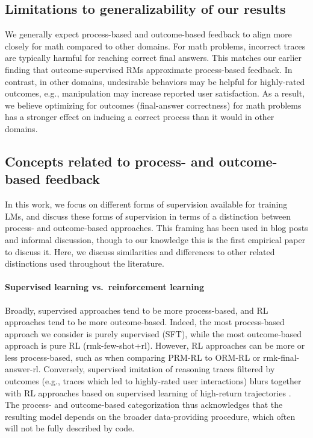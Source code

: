\documentclass[11pt, a4paper, logo]{deepmind}
\newcommand{\Short}[1]{\csname rmk-#1\endcsname}
\newcommand{\finalanswerrl}{\Short{final-answer-rl}}
\newcommand{\ormrl}{ORM-RL}
\newcommand{\prmrl}{PRM-RL}
\begin{document}
{\subsection{Limitations to generalizability of our results}

We generally expect process-based and outcome-based feedback to align more closely for math compared to other domains.
For math problems, incorrect traces are typically harmful for reaching correct final answers.
This matches our earlier finding that outcome-supervised RMs approximate process-based feedback.
In contrast, in other domains, undesirable behaviors may be helpful for highly-rated outcomes, e.g., manipulation may increase reported user satisfaction.
As a result, we believe optimizing for outcomes (final-answer correctness) for math problems has a stronger effect on inducing a correct process than it would in other domains. 




 
\subsection{Concepts related to process- and outcome-based feedback}

In this work, we focus on different forms of supervision available for training LMs, and discuss these forms of supervision in terms of a distinction between process- and outcome-based approaches.
This framing has been used in blog posts \citep{ought2022supervise} and informal discussion, though to our knowledge this is the first empirical paper to discuss it.
Here, we discuss similarities and differences to other related distinctions used throughout the literature.

\paragraph{Supervised learning vs.\ reinforcement learning}
Broadly, supervised approaches tend to be more process-based, and RL approaches tend to be more outcome-based.
Indeed, the most process-based approach we consider is purely supervised (SFT), while the most outcome-based approach is pure RL (\Short{few-shot+rl}).
However, RL approaches can be more or less process-based, such as when comparing \prmrl{} to \ormrl{} or \finalanswerrl.
Conversely, supervised imitation of reasoning traces filtered by outcomes (e.g., traces which led to highly-rated user interactions) blurs together with RL approaches based on supervised learning of high-return trajectories \citep{silver2017mastering, anthony2017thinking, abdolmaleki2018maximum}.
The process- and outcome-based categorization thus acknowledges that the resulting model depends on the broader data-providing procedure, which often will not be fully described by code.

}
\end{document}
